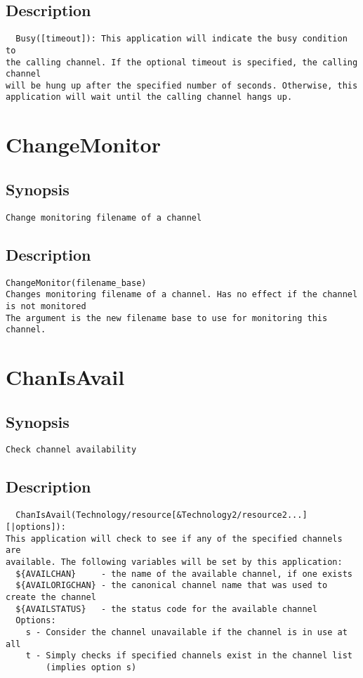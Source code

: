 \subsection{Description}
\begin{verbatim}
  Busy([timeout]): This application will indicate the busy condition to
the calling channel. If the optional timeout is specified, the calling channel
will be hung up after the specified number of seconds. Otherwise, this
application will wait until the calling channel hangs up.

\end{verbatim}


\section{ChangeMonitor}
\subsection{Synopsis}
\begin{verbatim}
Change monitoring filename of a channel
\end{verbatim}
\subsection{Description}
\begin{verbatim}
ChangeMonitor(filename_base)
Changes monitoring filename of a channel. Has no effect if the channel is not monitored
The argument is the new filename base to use for monitoring this channel.

\end{verbatim}


\section{ChanIsAvail}
\subsection{Synopsis}
\begin{verbatim}
Check channel availability
\end{verbatim}
\subsection{Description}
\begin{verbatim}
  ChanIsAvail(Technology/resource[&Technology2/resource2...][|options]): 
This application will check to see if any of the specified channels are
available. The following variables will be set by this application:
  ${AVAILCHAN}     - the name of the available channel, if one exists
  ${AVAILORIGCHAN} - the canonical channel name that was used to create the channel
  ${AVAILSTATUS}   - the status code for the available channel
  Options:
    s - Consider the channel unavailable if the channel is in use at all
    t - Simply checks if specified channels exist in the channel list
        (implies option s) 

\end{verbatim}


